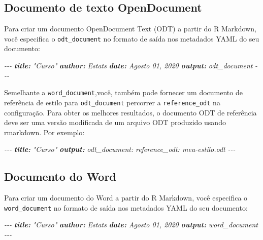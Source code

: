 \documentclass[
]{book}
\newenvironment{Shaded}{\begin{snugshade}}{\end{snugshade}}
\newcommand{\AnnotationTok}[1]{\textcolor[rgb]{0.56,0.35,0.01}{\textbf{\textit{#1}}}}
\newcommand{\CommentTok}[1]{\textcolor[rgb]{0.56,0.35,0.01}{\textit{#1}}}
\begin{document}
\hypertarget{documento-de-texto-opendocument}{%
\subsection{Documento de texto OpenDocument}\label{documento-de-texto-opendocument}}

Para criar um documento OpenDocument Text (ODT) a partir do R Markdown, você especifica o \texttt{odt\_document} no formato de saída nos metadados YAML do seu documento:

\begin{Shaded}
\begin{Highlighting}[]
\CommentTok{{-}{-}{-}}
\AnnotationTok{title:}\CommentTok{ "Curso"}
\AnnotationTok{author:}\CommentTok{ Estats}
\AnnotationTok{date:}\CommentTok{ Agosto 01, 2020}
\AnnotationTok{output:}\CommentTok{ odt\_document}
\CommentTok{{-}{-}{-}}
\end{Highlighting}
\end{Shaded}

Semelhante a \texttt{word\_document},você, também pode fornecer um documento de referência de estilo para \texttt{odt\_document} percorrer a \texttt{reference\_odt} na configuração. Para obter os melhores resultados, o documento ODT de referência deve ser uma versão modificada de um arquivo ODT produzido usando rmarkdown. Por exemplo:

\begin{Shaded}
\begin{Highlighting}[]
\CommentTok{{-}{-}{-}}
\AnnotationTok{title:}\CommentTok{ "Curso"}
\AnnotationTok{output:}
\CommentTok{  odt\_document:}
\CommentTok{    reference\_odt: meu{-}estilo.odt}
\CommentTok{{-}{-}{-}}
\end{Highlighting}
\end{Shaded}

\hypertarget{documento-do-word}{%
\subsection{Documento do Word}\label{documento-do-word}}

Para criar um documento do Word a partir do R Markdown, você especifica o \texttt{word\_document} no formato de saída nos metadados YAML do seu documento:

\begin{Shaded}
\begin{Highlighting}[]
\CommentTok{{-}{-}{-}}
\AnnotationTok{title:}\CommentTok{ "Curso"}
\AnnotationTok{author:}\CommentTok{ Estats}
\AnnotationTok{date:}\CommentTok{ Agosto 01, 2020}
\AnnotationTok{output:}\CommentTok{ word\_document}
\CommentTok{{-}{-}{-}}
\end{Highlighting}
\end{Shaded}
\end{document}
